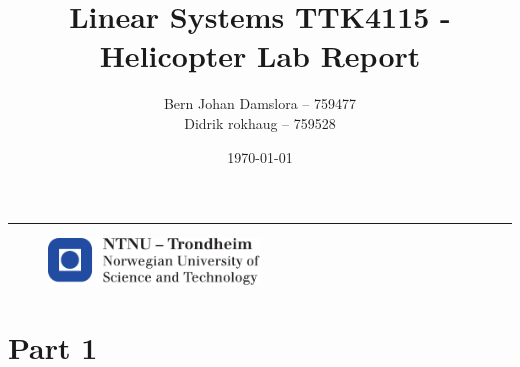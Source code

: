 \documentclass{article}
\title{Linear Systems TTK4115 - Helicopter Lab Report}
\author{Bern Johan Damslora -- 759477 \\ Didrik rokhaug -- 759528}
\date{\today}
\begin{document}
\begin{titlepage}
    \maketitle
    \rule{\linewidth}{0.5mm}
    \begin{figure}
    \centering
    \includegraphics[width=0.5\textwidth]{images/logontnu_eng}
    \end{figure}
    \thispagestyle{empty}
\end{titlepage}

\tableofcontents
\thispagestyle{empty} %
\newpage    

\setcounter{page}{1}
\section{Part 1}



\newpage

\end{document}
